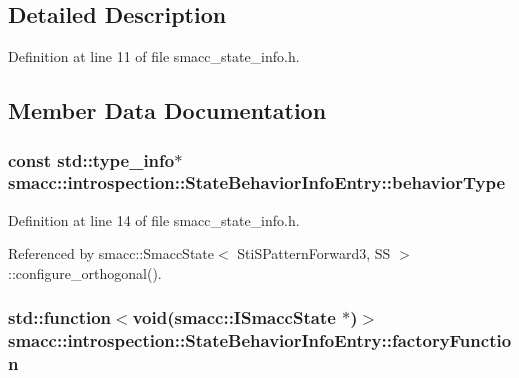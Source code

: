 \subsection{Detailed Description}


Definition at line 11 of file smacc\+\_\+state\+\_\+info.\+h.



\subsection{Member Data Documentation}
\subsubsection[{\texorpdfstring{behavior\+Type}{behaviorType}}]{\setlength{\rightskip}{0pt plus 5cm}const std\+::type\+\_\+info$\ast$ smacc\+::introspection\+::\+State\+Behavior\+Info\+Entry\+::behavior\+Type}\hypertarget{structsmacc_1_1introspection_1_1StateBehaviorInfoEntry_a7817d4924f26f4ef16dfdcf40b78b337}{}\label{structsmacc_1_1introspection_1_1StateBehaviorInfoEntry_a7817d4924f26f4ef16dfdcf40b78b337}


Definition at line 14 of file smacc\+\_\+state\+\_\+info.\+h.



Referenced by smacc\+::\+Smacc\+State$<$ Sti\+S\+Pattern\+Forward3, S\+S $>$\+::configure\+\_\+orthogonal().

\subsubsection[{\texorpdfstring{factory\+Function}{factoryFunction}}]{\setlength{\rightskip}{0pt plus 5cm}std\+::function$<$void({\bf smacc\+::\+I\+Smacc\+State} $\ast$)$>$ smacc\+::introspection\+::\+State\+Behavior\+Info\+Entry\+::factory\+Function}\hypertarget{structsmacc_1_1introspection_1_1StateBehaviorInfoEntry_ac7db4e9a687700edb0207ee100aa3576}{}\label{structsmacc_1_1introspection_1_1StateBehaviorInfoEntry_ac7db4e9a687700edb0207ee100aa3576}


